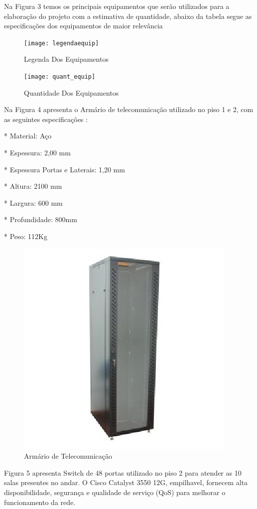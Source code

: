 \documentclass[	DIV=calc,%
							paper=a4,%
							fontsize=12pt,%
							onecolumn]{scrartcl}	 					%
\begin{document}
Na Figura 3 temos os principais equipamentos que serão utilizados para a elaboração do
projeto com a estimativa de quantidade, abaixo da tabela segue as especificações dos equipamentos de maior relevância 

\begin{figure}
	\centering
	\texttt{[image: legendaequip]}
	\caption{ Legenda Dos Equipamentos }
	\label{fig:legendaequip}
\end{figure}

\begin{figure}
	\centering
	\texttt{[image: quant\_equip]}
	\caption{Quantidade Dos Equipamentos }
	\label{fig:quantequip}
\end{figure}

Na Figura 4 apresenta o Armário de telecomunicação utilizado no piso 1 e 2, com as seguintes especificações : 

* Material: Aço

* Espessura: 2,00 mm

* Espessura Portas e Laterais: 1,20 mm

* Altura: 2100 mm

* Largura: 600 mm

* Profundidade: 800mm

* Peso: 112Kg


\begin{figure}
	\centering
	\includegraphics[width=0.7\linewidth]{racktelecom}
	\caption{ Armário de Telecomunicação}
	\label{fig:racktelecom}
\end{figure}


Figura 5 apresenta Switch de 48 portas utilizado no piso 2 para atender as 10 salas
presentes no andar. O Cisco Catalyst 3550 12G, empilhavel, fornecem alta disponibilidade, segurança e qualidade de serviço (QoS) para melhorar o funcionamento da rede. 
\end{document}
